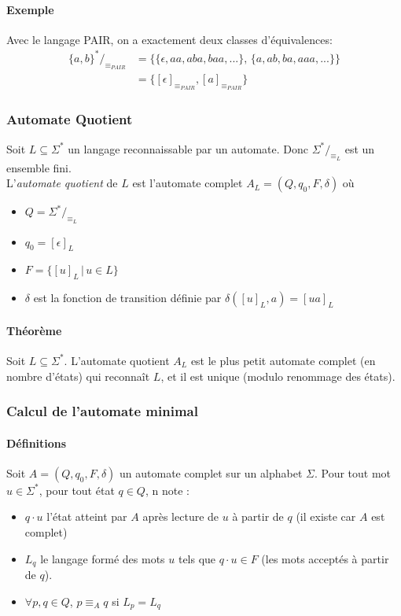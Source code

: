 \documentclass[a4paper]{article}
\begin{document}
  \paragraph{Exemple} Avec le langage PAIR, on a exactement deux classes 
d'équivalences:
  \begin{align*}
    \{a,b\}^*/_{\equiv_{PAIR}} & = \{ \{\epsilon, aa, aba, baa,...\},\, 
\{a, ab, ba, aaa,...\} \}\\
    & = \{[\epsilon]_{\equiv_{PAIR}}, [a]_{\equiv_{PAIR}}\}
  \end{align*}

  \subsubsection{Automate Quotient}
  Soit $L \subseteq \Sigma^*$ un langage reconnaissable par un automate. 
  Donc $\Sigma^*/_{\equiv_L}$ est un ensemble fini.\\

  L'\textit{automate quotient} de $L$ est l'automate complet $A_L = (Q, 
q_0, F, \delta)$ où
  \begin{itemize}
    \item $Q = \Sigma^*/_{\equiv_L}$
    \item $q_0 = [\epsilon]_L$
    \item $F = \{ [u]_L\, |\, u \in L \}$
    \item $\delta$ est la fonction de transition définie par 
$\delta([u]_L, a) = [ua]_L$
  \end{itemize}

  \paragraph{Théorème} Soit $L \subseteq \Sigma^*$. L'automate quotient 
$A_L$ est
  le plus petit automate complet (en nombre d'états) qui reconnaît $L$, 
et il est 
  unique (modulo renommage des états).

  \subsubsection{Calcul de l'automate minimal}
  \paragraph{Définitions}
  Soit $A = (Q, q_0, F, \delta)$ un automate complet sur un alphabet 
$\Sigma$. 
  Pour tout mot $u \in \Sigma^*$, pour tout état $q \in Q$, n note :
  \begin{itemize}
    \item $q \cdot u$ l'état atteint par $A$ après lecture de $u$ à 
partir de $q$
    (il existe car $A$ est complet)
    \item $L_q$ le langage formé des mots $u$ tels que $q\cdot u \in F$ 
(les mots
    acceptés à partir de $q$).
    \item $\forall p,q\in Q$, $p \equiv_A q$ si $L_p = L_q$
  \end{itemize}
\end{document}
